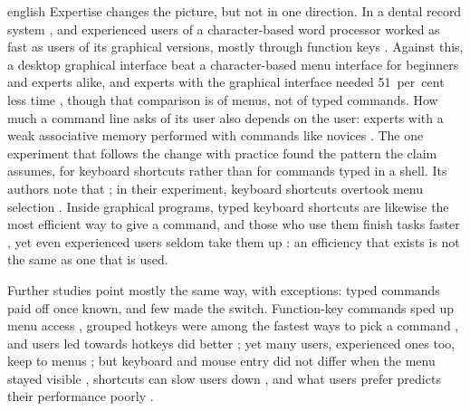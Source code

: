 \begin{onlyin}{english}
Expertise changes the picture, but not in one direction.  In a dental
record system , and experienced users of a character-based word
processor worked as fast as users of its graphical versions, mostly
through function keys \autocite{dYdewalle1995Graphical}.  Against this,
a desktop graphical interface beat a character-based menu interface
for beginners and experts alike, and experts with the graphical
interface needed 51~per~cent less time
\autocite{Rauterberg1992Empirical}, though that comparison is of menus,
not of typed commands.  How much a command line asks of its
user also depends on the user: experts with a weak associative memory
performed with commands like novices \autocite{Westerman1997Individual}.
The one experiment that follows the change with practice found the
pattern the claim assumes, for keyboard shortcuts rather than for
commands typed in a shell.  Its authors note that
; in
their experiment, keyboard shortcuts overtook menu selection
.
Inside graphical programs, typed keyboard shortcuts are likewise the
most efficient way to give a command, and those who use them finish
tasks faster \autocite{Jardina2009Keyboard}, yet even experienced users
seldom take them up \autocite{Lane2005Hidden,Tak2013Satisficing}: an
efficiency that exists is not the same as one that is used.

Further studies point mostly the same way, with exceptions: typed
commands paid off once known, and few made the switch.  Function-key
commands sped up menu access
\autocite{Hammontree1991Communicating}, grouped hotkeys were among the
fastest ways to pick a command \autocite{Odell2004Toolglasses}, and
users led towards hotkeys did better \autocite{Scarr2011Dips}; yet many
users, experienced ones too, keep to menus
\autocite{Giannisakis2019Promoting}; but keyboard and mouse entry did not
differ when the menu stayed visible \autocite{Davies1989Effects},
shortcuts can slow users down \autocite{Howes2000Trouble}, and what
users prefer predicts their performance poorly
\autocite{Heasly1988Comparative}.


\end{onlyin}
